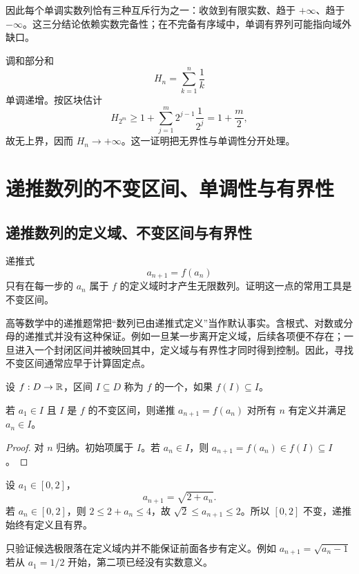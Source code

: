 因此每个单调实数列恰有三种互斥行为之一：收敛到有限实数、趋于 \(+\infty\)、趋于 \(-\infty\)。这三分结论依赖实数完备性；在不完备有序域中，单调有界列可能指向域外缺口。

\begin{example}
调和部分和
\[
 H_n=\sum_{k=1}^n\frac1k
\]
单调递增。按区块估计
\[
 H_{2^m}\ge1+\sum_{j=1}^m2^{j-1}\frac1{2^j}
=1+\frac m2,
\]
故无上界，因而 \(H_n\to+\infty\)。这一证明把无界性与单调性分开处理。
\end{example}

\section{递推数列的不变区间、单调性与有界性}

\subsection{递推数列的定义域、不变区间与有界性}


递推式
\[
 a_{n+1}=f(a_n)
\]
只有在每一步的 \(a_n\) 属于 \(f\) 的定义域时才产生无限数列。证明这一点的常用工具是不变区间。

高等数学中的递推题常把“数列已由递推式定义”当作默认事实。含根式、对数或分母的递推式并没有这种保证。例如一旦某一步离开定义域，后续各项便不存在；一旦进入一个封闭区间并被映回其中，定义域与有界性才同时得到控制。因此，寻找不变区间通常应早于计算固定点。

\begin{definition}
设 \(f:D\to\mathbb{R}\)，区间 \(I\subseteq D\) 称为 \(f\) 的一个，如果 \(f(I)\subseteq I\)。
\end{definition}

\begin{proposition}
若 \(a_1\in I\) 且 \(I\) 是 \(f\) 的不变区间，则递推 \(a_{n+1}=f(a_n)\) 对所有 \(n\) 有定义并满足 \(a_n\in I\)。
\end{proposition}

\begin{proof}
对 \(n\) 归纳。初始项属于 \(I\)。若 \(a_n\in I\)，则 \(a_{n+1}=f(a_n)\in f(I)\subseteq I\)。
\end{proof}

\begin{example}
设 \(a_1\in[0,2]\)，
\[
 a_{n+1}=\sqrt{2+a_n}.
\]
若 \(a_n\in[0,2]\)，则 \(2\le2+a_n\le4\)，故
\(\sqrt2\le a_{n+1}\le2\)。所以 \([0,2]\) 不变，递推始终有定义且有界。
\end{example}

只验证候选极限落在定义域内并不能保证前面各步有定义。例如 \(a_{n+1}=\sqrt{a_n-1}\) 若从 \(a_1=1/2\) 开始，第二项已经没有实数意义。

